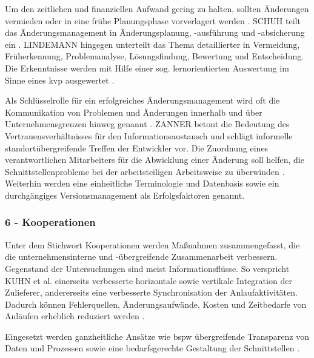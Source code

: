 Um den zeitlichen und finanziellen Aufwand gering zu halten, sollten Änderungen vermieden oder in eine frühe Planungsphase vorverlagert werden \cite{Schuh2008, Jania2004, Ass98}. 
SCHUH teilt das Änderungsmanagement in Änderungsplanung, -ausführung und -absicherung ein \cite[217]{Schuh2008}. 
LINDEMANN hingegen unterteilt das Thema detaillierter in Vermeidung, Früherkennung, Problemanalyse, Lösungsfindung, Bewertung und Entscheidung. Die Erkenntnisse werden mit Hilfe einer sog. lernorientierten Auswertung im Sinne eines \gls{kvp} ausgewertet \cite{Lindemann1998}. 

Als Schlüsselrolle für ein erfolgreiches Änderungsmanagement wird oft die Kommunikation von Problemen und Änderungen innerhalb und über Unternehmensgrenzen hinweg genannt \cite{Kuhn2002, Schuh2008}.
ZANNER betont die Bedeutung des Vertrauensverhältnisses für den Informationsaustausch und schlägt informelle standortübergreifende Treffen der Entwickler vor. Die Zuordnung eines verantwortlichen Mitarbeiters für die Abwicklung einer Änderung soll helfen, die Schnittstellenprobleme bei der arbeitsteiligen Arbeitsweise zu überwinden  \cite[42]{Zanner2002}.
Weiterhin werden eine einheitliche Terminologie \cite{Zanner2002} und Datenbasis sowie ein durchgängiges Versionsmanagement \cite{Kuhn2002} als Erfolgsfaktoren genannt. 
\subsubsection*{6 - Kooperationen}
Unter dem Stichwort Kooperationen werden Maßnahmen zusammengefasst, die die unternehmensinterne und -übergreifende Zusammenarbeit verbessern. Gegenstand der Untersuchungen sind meist Informationsflüsse. 
So verspricht KUHN et al. einerseits verbesserte horizontale sowie vertikale Integration der Zulieferer, andererseits eine verbesserte Synchronisation der Anlaufaktivitäten. Dadurch können Fehlerquellen, Änderungsaufwände, Kosten und Zeitbedarfe von Anläufen erheblich reduziert werden \cite[26]{Kuhn2002}. 

Eingesetzt werden ganzheitliche Ansätze wie \gls{bspw} übergreifende Transparenz von Daten und Prozessen sowie eine bedarfsgerechte Gestaltung der Schnittstellen \cite{Kuhn2002}. 


